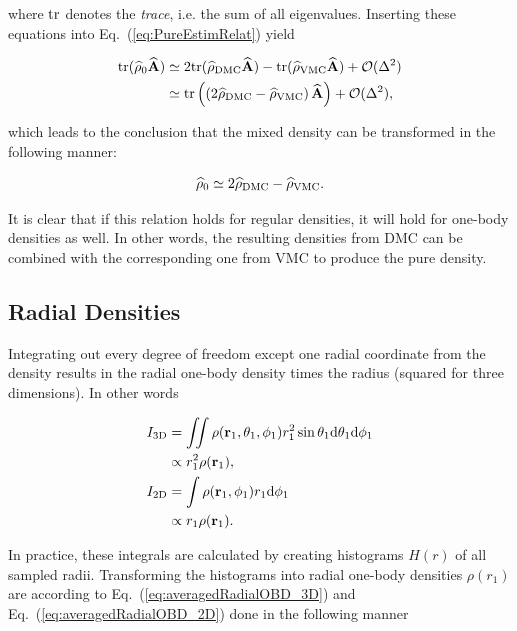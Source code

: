 where $\mathrm{tr}$ denotes the \textit{trace}, i.e. the sum of all eigenvalues. Inserting these equations into Eq.~(\ref{eq:PureEstimRelat}) yield

\begin{align}
 \mathrm{tr}({\bf\widehat{\rho}}_0{\bf\widehat{A}}) &\simeq 2\mathrm{tr}({\bf\widehat{\rho}}_\mathrm{DMC}{\bf\widehat{A}}) -  \mathrm{tr}({\bf\widehat{\rho}}_\mathrm{VMC}{\bf\widehat{A}}) + \mathcal{O}(\Delta^2) \notag\\
  &\simeq \mathrm{tr}\left(\left(2{\bf\widehat{\rho}}_\mathrm{DMC} - {\bf\widehat{\rho}}_\mathrm{VMC}\right){\bf\widehat{A}}\right) + \mathcal{O}(\Delta^2),
\end{align}

which leads to the conclusion that the mixed density can be transformed in the following manner:

\begin{equation}
 {\bf\widehat{\rho}}_0 \simeq 2{\bf\widehat{\rho}}_\mathrm{DMC} - {\bf\widehat{\rho}}_\mathrm{VMC} .\label{eq:densityTransform}
\end{equation}

It is clear that if this relation holds for regular densities, it will hold for one-body densities as well. In other words, the resulting densities from DMC can be combined with the corresponding one from VMC to produce the pure density.

\subsection{Radial Densities}

Integrating out every degree of freedom except one radial coordinate from the density results in the radial one-body density times the radius (squared for three dimensions). In other words

\begin{align}
 I_\mathrm{3D} &= \iint \rho (\mathbf{r}_1, \theta_1, \phi_1)r_1^2\sin\theta_1\mathrm{d}\theta_1\mathrm{d}\phi_1 \notag\\
   &\propto r_1^2\rho(\mathbf{r}_1), \label{eq:averagedRadialOBD_3D} \\
 I_\mathrm{2D} &= \int \rho (\mathbf{r}_1, \phi_1)r_1\mathrm{d}\phi_1 \notag\\
   &\propto r_1\rho(\mathbf{r}_1). \label{eq:averagedRadialOBD_2D}
\end{align}

In practice, these integrals are calculated by creating histograms $H(r)$ of all sampled radii. Transforming the histograms into radial one-body densities $\rho(r_1)$ are according to Eq.~(\ref{eq:averagedRadialOBD_3D}) and Eq.~(\ref{eq:averagedRadialOBD_2D}) done in the following manner

